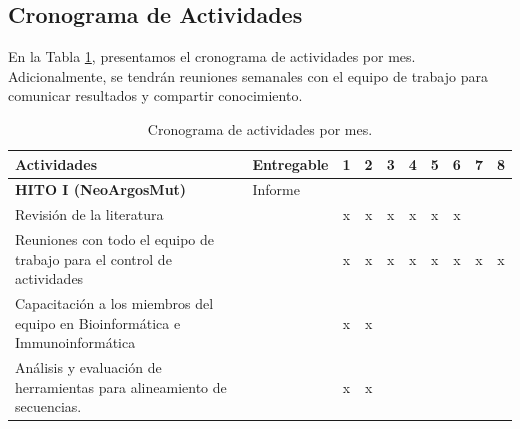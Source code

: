 \documentclass[a4paper,11pt]{article}
\begin{document}
\clearpage

\subsection{Cronograma de Actividades}
En la Tabla \ref{tab:actv}, presentamos el cronograma de actividades por mes. Adicionalmente, se tendrán reuniones semanales con el equipo de trabajo para comunicar resultados y compartir conocimiento.


\begin{table}[H]
	\centering
	\setlength{\tabcolsep}{0.6em} %
	{\renewcommand{\arraystretch}{1.7}%
		\caption{Cronograma de actividades por mes.}
		\label{tab:actv}
{\small
 \begin{tabular}{|p{10cm}|l|c|c|c|c|c|c|c|c|} \hline
		\textbf{Actividades}                                  &   \textbf{Entregable}         & 1 & 2 & 3 & 4 & 5 & 6 & 7 & 8  \\ \hline
		
		\textbf{HITO I (NeoArgosMut)} &  Informe & & & & & & & & \\
		Revisión de la literatura       &                       & x                     & x                      & x                       & x                      &     x                  &      x                  &                                              &    \\

            Reuniones con todo el equipo de trabajo para el control de actividades       &                       & x                     & x                      & x                       & x                      &     x                  &      x                  &         x                                     &  x  \\


            Capacitación a los miembros del equipo en Bioinformática e Immunoinformática       &                       & x                     & x                      &                        &                       &                       &                        &                                              &    \\


            Análisis y evaluación de herramientas para alineamiento de secuencias.       &                       & x                     & x                      &                        & 
            &                       &                        &                                              &    \\


\end{tabular}}}
\end{table}
\end{document}
